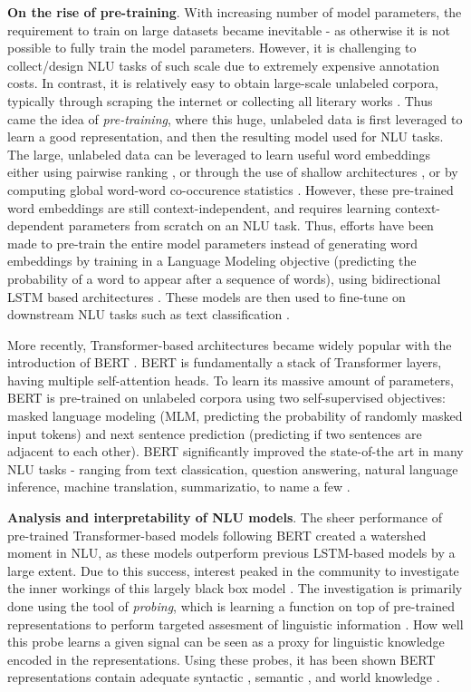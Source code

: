 \documentclass[12pt]{article}
\newcommand{\xhdr}[1]{{\noindent\bfseries #1}.}
\begin{document}
\xhdr{On the rise of pre-training} With increasing number of model parameters, the requirement to train on large datasets became inevitable - as otherwise it is not possible to fully train the model parameters. However, it is challenging to collect/design NLU tasks of such scale due to extremely expensive annotation costs. In contrast, it is relatively easy to obtain large-scale unlabeled corpora, typically through scraping the internet \cite{raffel2019exploring} or collecting all literary works \cite{zhu2015aligning}. Thus came the idea of \textit{pre-training}, where this huge, unlabeled data is first leveraged to learn a good representation, and then the resulting model used for NLU tasks. The large, unlabeled data can be leveraged to learn useful word embeddings either using pairwise ranking \cite{collobert2008unified}, or through the use of shallow architectures \cite{mikolov2013efficient}, or by computing global word-word co-occurence statistics \cite{pennington2014glove}. However, these pre-trained word embeddings are still context-independent, and requires learning context-dependent parameters from scratch on an NLU task. Thus, efforts have been made to pre-train the entire model parameters instead of generating word embeddings by training in a Language Modeling objective (predicting the probability of a word to appear after a sequence of words), using bidirectional LSTM based architectures \cite{peters2018deep}. These models are then used to fine-tune on downstream NLU tasks such as text classification \cite{howard2018universal}.

More recently, Transformer-based architectures became widely popular with the introduction of BERT \cite{devlin2018bert}. BERT is fundamentally a stack of Transformer layers, having multiple self-attention heads. To learn its massive amount of parameters, BERT is pre-trained on unlabeled corpora using two self-supervised objectives: masked language modeling (MLM, predicting the probability of randomly masked input tokens) and next sentence prediction (predicting if two sentences are adjacent to each other). BERT significantly improved the state-of-the art in many NLU tasks - ranging from text classication, question answering, natural language inference, machine translation, summarizatio, to name a few \cite{qiu2020}.

\xhdr{Analysis and interpretability of NLU models}
The sheer performance of pre-trained Transformer-based models following BERT created a watershed moment in NLU, as these models outperform previous LSTM-based models by a large extent. Due to this success, interest peaked in the community to investigate the inner workings of this largely black box model \cite{rogers2020}. The investigation is primarily done using the tool of \textit{probing}, which is learning a function on top of pre-trained representations to perform targeted assesment of linguistic information \cite{hupkes2018visualisation}. How well this probe learns a given signal can be seen as a proxy for linguistic knowledge encoded in the representations. Using these probes, it has been shown BERT representations contain adequate syntactic \cite{hewitt-manning-2019-structural,jawahar-etal-2019-bert}, semantic \cite{tenney-etal-2019-bert,ettinger2020}, and world knowledge \cite{petroni2019language, rogers2020}.
\end{document}

